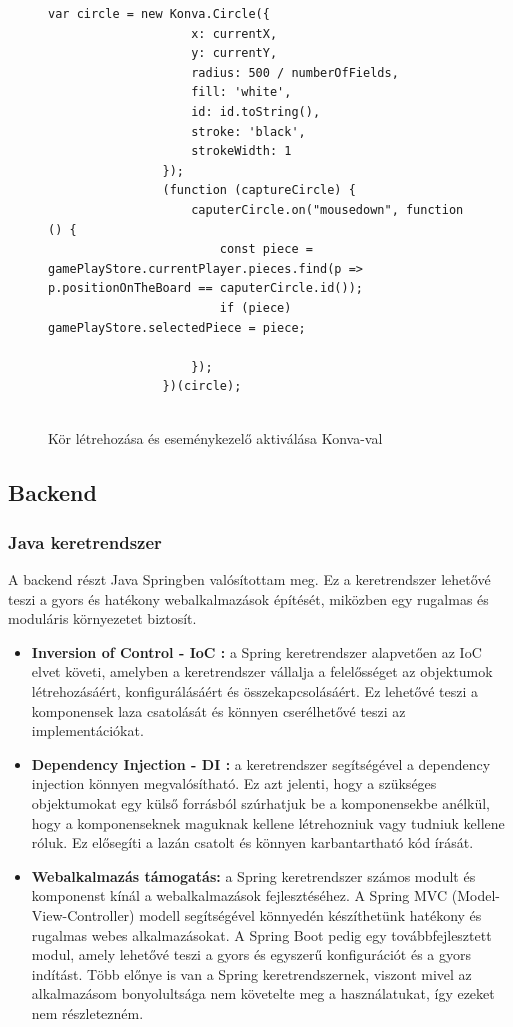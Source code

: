 \documentclass[a4paper,twoside]{article}
\begin{document}
\begin{figure}
	\caption{Kör létrehozása és eseménykezelő aktiválása Konva-val}
		\begin{minipage}{\textwidth}
			\begin{lstlisting}[style=javascriptStyle]
				var circle = new Konva.Circle({
					x: currentX,
					y: currentY,
					radius: 500 / numberOfFields,
					fill: 'white',
					id: id.toString(),
					stroke: 'black',
					strokeWidth: 1
				});
				(function (captureCircle) {
					caputerCircle.on("mousedown", function () {
						const piece = gamePlayStore.currentPlayer.pieces.find(p => p.positionOnTheBoard == caputerCircle.id());
						if (piece) gamePlayStore.selectedPiece = piece;
						
					});
				})(circle);
				
			\end{lstlisting}
		\end{minipage}
	
	\label{konva}
\end{figure} 
\FloatBarrier
\subsection{Backend}

\subsubsection{Java keretrendszer}
A backend részt Java Springben valósítottam meg. Ez a keretrendszer lehetővé teszi a gyors és hatékony
webalkalmazások építését, miközben egy rugalmas és moduláris környezetet biztosít.
\begin{itemize}
	\item  \textbf{Inversion of Control - IoC \cite{ioc}:} a Spring keretrendszer alapvetően az IoC elvet követi,
	amelyben a keretrendszer vállalja a felelősséget az objektumok létrehozásáért,
	konfigurálásáért és összekapcsolásáért. Ez lehetővé teszi a komponensek laza
	csatolását és könnyen cserélhetővé teszi az implementációkat.
	\item \textbf{Dependency Injection - DI \cite{dependencyInj}:} a keretrendszer segítségével a dependency
	injection könnyen megvalósítható. Ez azt jelenti, hogy a szükséges objektumokat egy
	külső forrásból szúrhatjuk be a komponensekbe anélkül, hogy a komponenseknek
	maguknak kellene létrehozniuk vagy tudniuk kellene róluk. Ez elősegíti a lazán
	csatolt és könnyen karbantartható kód írását.
	\item \textbf{Webalkalmazás támogatás:} a Spring keretrendszer számos modult és komponenst
	kínál a webalkalmazások fejlesztéséhez. A Spring MVC (Model-View-Controller)
	modell segítségével könnyedén készíthetünk hatékony és rugalmas webes
	alkalmazásokat. A Spring Boot pedig egy továbbfejlesztett modul, amely lehetővé
	teszi a gyors és egyszerű konfigurációt és a gyors indítást. Több előnye is van a Spring
	keretrendszernek, viszont mivel az alkalmazásom bonyolultsága nem követelte meg a
	használatukat, így ezeket nem részletezném.
\end{itemize}
\end{document}
